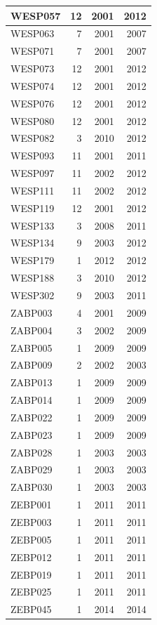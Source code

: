 \documentclass[11pt,]{book}
\begin{document}
\begin{table}
\begin{tabular}[t]{l|r|r|r}
\hline
WESP057 & 12 & 2001 & 2012\\
\hline
WESP063 & 7 & 2001 & 2007\\
\hline
WESP071 & 7 & 2001 & 2007\\
\hline
WESP073 & 12 & 2001 & 2012\\
\hline
WESP074 & 12 & 2001 & 2012\\
\hline
WESP076 & 12 & 2001 & 2012\\
\hline
WESP080 & 12 & 2001 & 2012\\
\hline
WESP082 & 3 & 2010 & 2012\\
\hline
WESP093 & 11 & 2001 & 2011\\
\hline
WESP097 & 11 & 2002 & 2012\\
\hline
WESP111 & 11 & 2002 & 2012\\
\hline
WESP119 & 12 & 2001 & 2012\\
\hline
WESP133 & 3 & 2008 & 2011\\
\hline
WESP134 & 9 & 2003 & 2012\\
\hline
WESP179 & 1 & 2012 & 2012\\
\hline
WESP188 & 3 & 2010 & 2012\\
\hline
WESP302 & 9 & 2003 & 2011\\
\hline
ZABP003 & 4 & 2001 & 2009\\
\hline
ZABP004 & 3 & 2002 & 2009\\
\hline
ZABP005 & 1 & 2009 & 2009\\
\hline
ZABP009 & 2 & 2002 & 2003\\
\hline
ZABP013 & 1 & 2009 & 2009\\
\hline
ZABP014 & 1 & 2009 & 2009\\
\hline
ZABP022 & 1 & 2009 & 2009\\
\hline
ZABP023 & 1 & 2009 & 2009\\
\hline
ZABP028 & 1 & 2003 & 2003\\
\hline
ZABP029 & 1 & 2003 & 2003\\
\hline
ZABP030 & 1 & 2003 & 2003\\
\hline
ZEBP001 & 1 & 2011 & 2011\\
\hline
ZEBP003 & 1 & 2011 & 2011\\
\hline
ZEBP005 & 1 & 2011 & 2011\\
\hline
ZEBP012 & 1 & 2011 & 2011\\
\hline
ZEBP019 & 1 & 2011 & 2011\\
\hline
ZEBP025 & 1 & 2011 & 2011\\
\hline
ZEBP045 & 1 & 2014 & 2014\\

\end{tabular}
\end{table}
\end{document}
